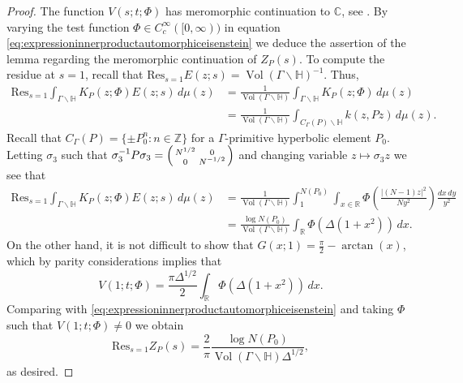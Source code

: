 \documentclass{article}
\theoremstyle{named}
\newcommand{\Z}{\mathbb{Z}}
\newcommand{\CC}{\mathbb{C}}
\newcommand{\Hyp}{\mathbb{H}}
\newcommand{\R}{\mathbb{R}}
\DeclareMathOperator{\vol}{Vol}
\begin{document}
\begin{proof}
The function $V(s;t; \Phi)$ has meromorphic continuation to $\CC$, see \cite[Proposition 4]{zagierrankinselberg}. By varying the test function $\Phi \in C_c^\infty([0, \infty))$ in equation \eqref{eq:expressioninnerproductautomorphiceisenstein} we deduce the assertion of the lemma regarding the meromorphic continuation of $Z_P(s)$. To compute the residue at $s = 1$, recall that $\text{Res}_{s = 1} E(z; s) = \vol(\Gamma\backslash \Hyp)^{-1}$. Thus, 
\begin{equation*}
\begin{aligned}
    \text{Res}_{s = 1}\int_{\Gamma\backslash \Hyp} K_P(z; \Phi)E(z; s)\, d\mu(z) & = \frac{1}{\vol(\Gamma\backslash \Hyp)} \int_{\Gamma\backslash\Hyp} K_P(z; \Phi) \, d\mu(z)\\
    & =  \frac{1}{\vol(\Gamma\backslash \Hyp)}\int_{C_\Gamma(P)\backslash \Hyp} k(z, Pz)\, d\mu(z).
\end{aligned}
\end{equation*}
Recall that $C_\Gamma(P) = \{\pm P_0^n: n \in \Z\}$ for a $\Gamma$-primitive hyperbolic element $P_0$. Letting $\sigma_3$ such that $\sigma_3^{-1}P\sigma_3 = \begin{psmallmatrix}
    N^{1/2}& 0\\
    0 & N^{-1/2}
\end{psmallmatrix}$ and changing variable $z \mapsto \sigma_3 z$ we see that 
\begin{equation*}
\begin{aligned}
    \text{Res}_{s = 1}\int_{\Gamma \backslash \Hyp} K_P(z; \Phi)E(z; s)\, d\mu(z) & = \frac{1}{\vol(\Gamma\backslash \Hyp)}\int_{1}^{N(P_0)}\int_{x \in \R} \Phi\left(\frac{|(N - 1)z|^2}{Ny^2}\right) \frac{dx \,  dy}{y^2}\\
    & = \frac{\log N(P_0)}{\vol(\Gamma\backslash \Hyp)} \int_\R \Phi(\Delta(1 + x^2))\, dx.
\end{aligned}
\end{equation*}
On the other hand, it is not difficult to show that $G(x; 1) = \frac{\pi}{2} - \arctan(x)$, which by parity considerations implies that
\begin{equation*}
    V(1; t; \Phi) = \frac{\pi \Delta^{1/2}}{2}\int_\R \Phi(\Delta(1 + x^2))\, dx.
\end{equation*}
Comparing with \eqref{eq:expressioninnerproductautomorphiceisenstein} and taking $\Phi$ such that $V(1; t; \Phi) \neq 0$ we obtain 
\begin{equation*}
    \text{Res}_{s = 1} Z_P(s) = \frac{2}{\pi}\frac{\log N(P_0)}{\vol(\Gamma\backslash \Hyp)\Delta^{1/2}},
\end{equation*}
as desired.
\end{proof}
\end{document}
